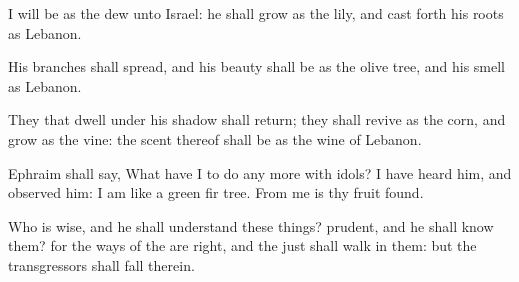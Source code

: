 \verse I will be as the dew unto Israel: he shall grow as the lily, and cast forth his roots as Lebanon.

\verse His branches shall spread, and his beauty shall be as the olive tree, and his smell as Lebanon.

\verse They that dwell under his shadow shall return; they shall revive as the corn, and grow as the vine: the scent thereof shall be as the wine of Lebanon.

\verse Ephraim shall say, What have I to do any more with idols? I have heard him, and observed him: I am like a green fir tree. From me is thy fruit found.

\verse Who is wise, and he shall understand these things? prudent, and he shall know them? for the ways of the \LORD are right, and the just shall walk in them: but the transgressors shall fall therein.


